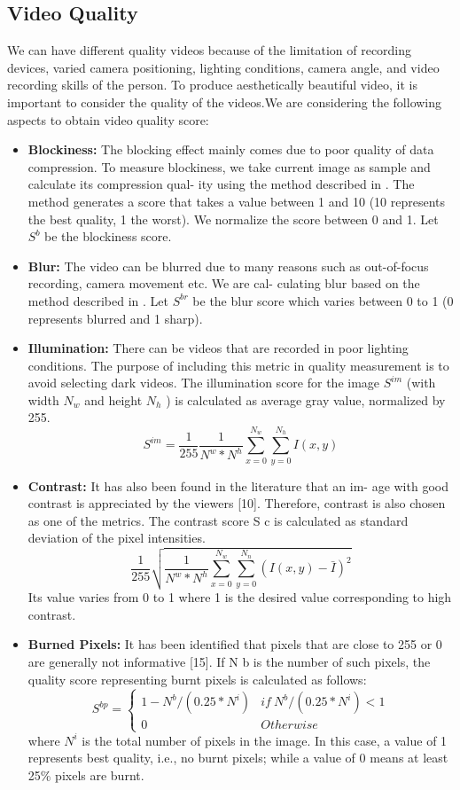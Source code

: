 \documentclass{sig-alternate}
\begin{document}
\subsection{Video Quality}
We can have different quality videos because of the limitation of
recording devices, varied camera positioning, lighting conditions,
camera angle, and video recording skills of the person. To produce
aesthetically beautiful video, it is important to consider the quality
of the videos.We are considering the following aspects to obtain
video quality score:
\begin{itemize}
\item \textbf{Blockiness:} The blocking effect mainly comes due to poor
quality of data compression. To measure blockiness, we take
current image as sample and calculate its compression qual-
ity using the method described in \cite{salas:eighteen}. The method generates
a score that takes a value between 1 and 10 (10 represents the
best quality, 1 the worst). We normalize the score between 0
and 1. Let $S^b$ be the blockiness score.
\item \textbf{Blur:} The video can be blurred due to many reasons such as
out-of-focus recording, camera movement etc. We are cal-
culating blur based on the method described in \cite{salas:five}. Let $S^{br}$
be the blur score which varies between 0 to 1 (0 represents
blurred and 1 sharp).
\item \textbf{Illumination:} There can be videos that are recorded in poor
lighting conditions. The purpose of including this metric in
quality measurement is to avoid selecting dark videos. The
illumination score for the image $S^{im}$ (with width $N_w$ and
height $N_h$ ) is calculated as average gray value, normalized
by 255.
\[S^{im}=\frac{1}{255}\frac{1}{N^w*N^h}\sum_{x=0}^{N_w}\sum_{y=0}^{N_h}I(x,y)\tag{9}\]
\item \textbf{Contrast:} It has also been found in the literature that an im-
age with good contrast is appreciated by the viewers [10].
Therefore, contrast is also chosen as one of the metrics. The
contrast score S c is calculated as standard deviation of the
pixel intensities.
\[\frac{1}{255}\sqrt{\frac{1}{N^w*N^h}\sum_{x=0}^{N_w}\sum_{y=0}^{N_n}(I(x,y)-\bar{I})^2}\tag{10}\]
Its value varies from 0 to 1 where 1 is the desired value corresponding to high contrast.
\item \textbf{Burned Pixels:} It has been identified that pixels that are
close to 255 or 0 are generally not informative [15]. If N b
is the number of such pixels, the quality score representing
burnt pixels is calculated as follows:
\[S^{bp}=\left\{\begin{matrix} 1-N^b/(0.25*N^i) & if\ N^b/(0.25*N^i)<1 \\ 0 & Otherwise \end{matrix}\right.\tag{11}\]
where $N^i$ is the total number of pixels in the image. In this
case, a value of 1 represents best quality, i.e., no burnt pixels;
while a value of 0 means at least 25\% pixels are burnt.


\end{itemize}
\end{document}
